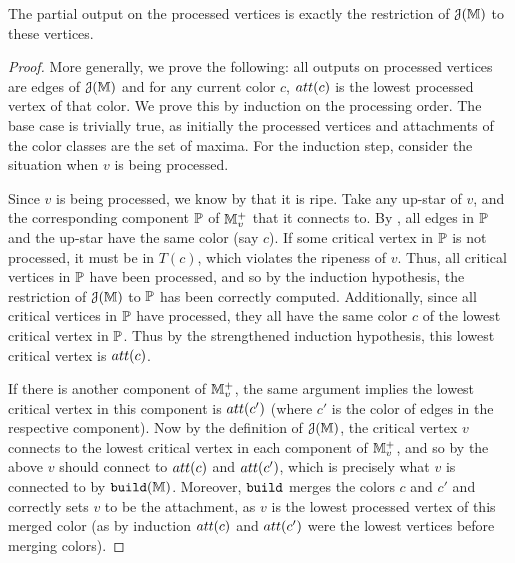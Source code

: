 \begin{claim} \label{clm:process} The partial output on the processed vertices is exactly
the restriction of ${\cal J}(\mathbb{M})$ to these vertices.
\end{claim}

\begin{proof} More generally, we prove the following: all outputs on processed vertices
are edges of ${\cal J}(\mathbb{M})$ and for any current color $c$, $att(c)$ is the lowest processed vertex
of that color. We prove this by induction on the processing order. The base case is trivially
true, as initially the processed vertices and attachments of the color classes are the set of maxima.
For the induction step, consider the situation
when $v$ is being processed.

Since $v$ is being processed, we know by  that it is ripe. Take any up-star of $v$, and the corresponding component $\mathbb{P}$
of $\mathbb{M}^+_v$ that it connects to. By , all edges in $\mathbb{P}$ and the up-star
have the same color (say $c$). If some critical vertex in $\mathbb{P}$ is not processed,
it must be in $T(c)$, which violates the ripeness of $v$.
Thus, all critical vertices in $\mathbb{P}$ have been processed, and so by the induction hypothesis, the restriction of ${\cal J}(\mathbb{M})$ to $\mathbb{P}$ has been correctly computed.
Additionally, since all critical vertices in $\mathbb{P}$ have processed, they all have the same color $c$ of the lowest critical vertex in $\mathbb{P}$.
Thus by the strengthened induction hypothesis, this lowest critical vertex is $att(c)$.

If there is another component of $\mathbb{M}^+_v$, the same argument implies 
the lowest critical vertex in this component is $att(c')$ (where $c'$ is the color of edges in the respective component).
Now by the definition of ${\cal J}(\mathbb{M})$, the critical vertex $v$ connects to the lowest critical vertex in each component of $\mathbb{M}^+_v$, 
and so by the above $v$ should connect to $att(c)$ and $att(c')$, which is precisely what $v$ is connected to by ${\tt build}(\mathbb{M})$.
Moreover, ${\tt build}$ merges the colors $c$ and $c'$ and correctly sets $v$ to be the attachment, 
as $v$ is the lowest processed vertex of this merged color (as by induction $att(c)$ and $att(c')$ were the lowest vertices before merging colors).


%
\end{proof}

